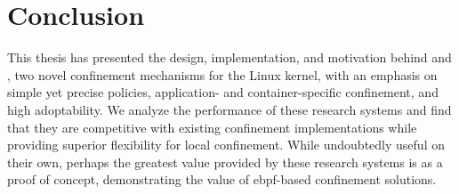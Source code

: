 





\section{Conclusion}
\label{s:disc-conclusion}

This thesis has presented the design, implementation, and motivation behind \bpfbox{} and
\bpfcontain{}, two novel confinement mechanisms for the Linux kernel, with an emphasis on
simple yet precise policies, application- and container-specific confinement, and high
adoptability. We analyze the performance of these research systems and find that they are
competitive with existing confinement implementations while providing superior flexibility
for local confinement. While undoubtedly useful on their own, perhaps the greatest value
provided by these research systems is as a proof of concept, demonstrating the value of
\gls{ebpf}-based confinement solutions.

